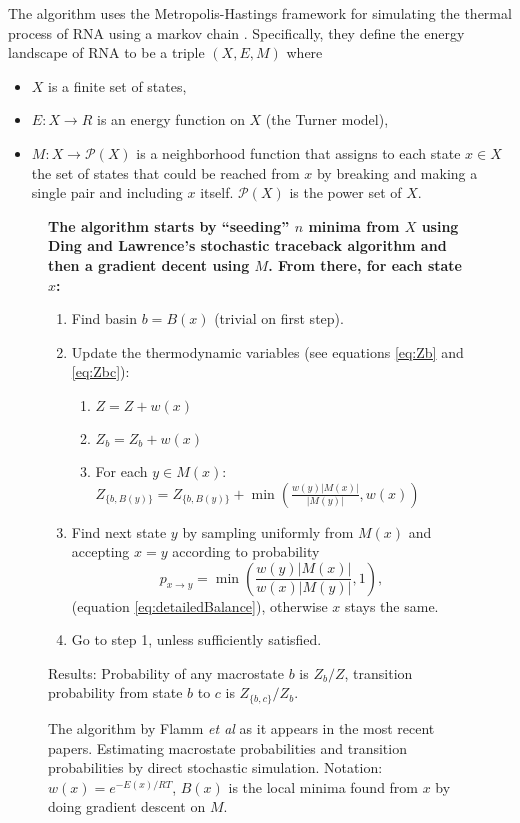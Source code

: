 The algorithm uses the Metropolis-Hastings framework for simulating
the thermal process of RNA using a markov chain
\cite{metropolis1953equation} \cite{hastings1970monte}. Specifically, they define the energy
landscape of RNA to be a triple $(X, E, M)$ where
\begin{itemize}
\item $X$ is a finite set of states,
\item $E: X \to R$ is an energy function on $X$ (the Turner model),
\item $M: X \to \mathcal{P}(X)$ is a neighborhood function that
  assigns to each state $x \in X$ the set of states that could be
  reached from $x$ by breaking and making a single pair and including
  $x$ itself. $\mathcal{P}(X)$ is the power set of $X$.
\end{itemize}
\begin{figure}[t]
\bf The algorithm starts by ``seeding'' $n$ minima from $X$ using Ding
and Lawrence's stochastic traceback algorithm and then a gradient
decent using $M$. From there, for each state $x$:
\begin{enumerate}
\item Find basin $b = B(x)$ (trivial on first step).
\item Update the thermodynamic variables (see equations \ref{eq:Zb}
  and \ref{eq:Zbc}):
\begin{enumerate}
\item $Z = Z + w(x)$
\item $Z_b = Z_b  + w(x)$
\item For each $y \in M(x)$: $Z_{\{b, B(y)\}} = Z_{\{b, B(y)\}} +  \min \left (\frac{ w(y)  | M(x) |}{| M(y) |} , w(x) \right )$
\end{enumerate}
\item Find next state $y$ by sampling uniformly from $M(x)$ and
  accepting $x=y$ according to probability 
  $$p_{x\to y} = \min \left (\frac{w(y)|M(x)|}{w(x)|M(y)|},1\right
  ),$$ (equation \ref{eq:detailedBalance}), otherwise $x$ stays the
  same.
\item Go to step 1, unless sufficiently satisfied.
\end{enumerate}
Results: Probability of any macrostate $b$ is $Z_b/Z$, transition
probability from state $b$ to $c$ is $Z_{\{b, c\}}/Z_b$.
\caption{The algorithm by Flamm \emph{et al} as it appears in the most
  recent papers. Estimating macrostate probabilities and transition
  probabilities by direct stochastic simulation. Notation:
  $w(x)=e^{-E(x)/RT}$, $B(x)$ is the local minima found from $x$ by
  doing gradient descent on $M$.}
\label{fig:barriersAlgorithm}
\end{figure}
